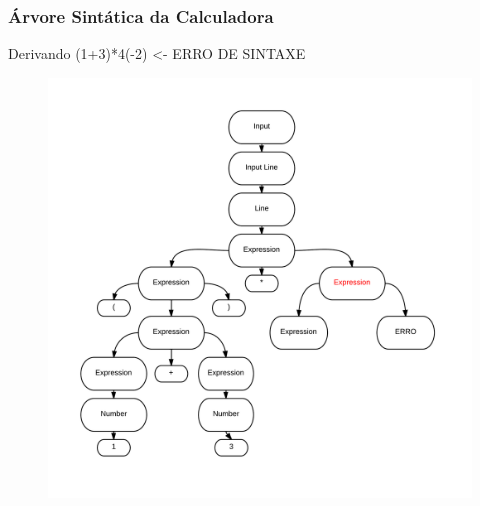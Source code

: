 \documentclass{beamer}
\begin{document}
\begin {frame}
\frametitle{Árvore Sintática da Calculadora }
Derivando (1+3)*4(-2) <- ERRO DE SINTAXE

\begin{figure} 	%
            \centering		%
            \includegraphics[scale=0.1]{7.png} %
            \end{figure} 

\end{frame}
\end{document}

